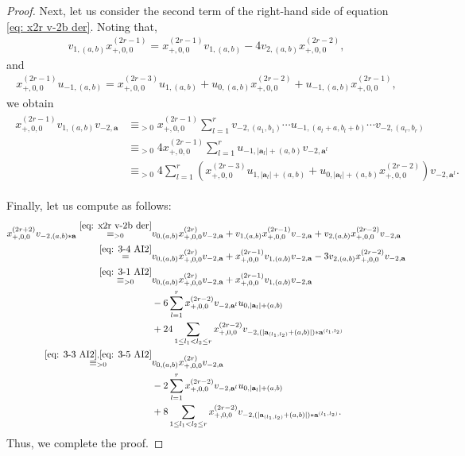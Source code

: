 \documentclass[12pt,a4paper]{amsart}
\theoremstyle{definition}
\numberwithin{equation}{subsection}
\begin{document}
\begin{proof}
  Next, let us consider the second term of the right-hand side of equation \eqref{eq: x2r v-2b der}.
  Noting that,
  \begin{align}\label{eq: 3-4 AI2}
    v_{1,(a,b)} x_{+,0,0}^{(2r-1)} = x_{+,0,0}^{(2r-1)} v_{1,(a,b)} -4v_{2,(a,b)} x_{+,0,0}^{(2r-2)},
  \end{align}
  and
  \begin{align*}
    x_{+,0,0}^{(2r-1)} u_{-1,(a,b)} = x_{+,0,0}^{(2r-3)} u_{1,(a,b)} + u_{0,(a,b)} x_{+,0,0}^{(2r-2)} + u_{-1,(a,b)}x_{+,0,0}^{(2r-1)},
  \end{align*}
  we obtain
  \begin{align}\label{eq: 3-5 AI2}
    \begin{split}
      x_{+,0,0}^{(2r-1)} v_{1,(a,b)} v_{-2,\mathbf{a}}
      &\equiv_{>0} x_{+,0,0}^{(2r-1)} \sum_{l=1}^r v_{-2,(a_1,b_1)} \cdots u_{-1,(a_l+a,b_l+b)} \cdots v_{-2,(a_r,b_r)}\\
      &\equiv_{>0} 4x_{+,0,0}^{(2r-1)} \sum_{l=1}^r u_{-1,|\mathbf{a}_l|+(a,b)} v_{-2,\mathbf{a}^l}\\
      &\equiv_{>0} 4\sum_{l=1}^r (x_{+,0,0}^{(2r-3)} u_{1,|\mathbf{a}_l|+(a,b)} + u_{0,|\mathbf{a}_l|+(a,b)} x_{+,0,0}^{(2r-2)}) v_{-2,\mathbf{a}^l}.
    \end{split}
  \end{align}
  
  Finally, let us compute as follows:
  \begin{align*}
    x_{+,0,0}^{(2r+2)} v_{-2,(a,b)*\mathbf{a}}
    \overset{\eqref{eq: x2r v-2b der}}{\equiv_{>0}}
    &v_{0,(a,b)} x_{+,0,0}^{(2r)} v_{-2,\mathbf{a}} + v_{1,(a,b)} x_{+,0,0}^{(2r-1)} v_{-2,\mathbf{a}} + v_{2,(a,b)} x_{+,0,0}^{(2r-2)} v_{-2,\mathbf{a}}\\
    \overset{\eqref{eq: 3-4 AI2}}{=}
    &v_{0,(a,b)} x_{+,0,0}^{(2r)} v_{-2,\mathbf{a}} + x_{+,0,0}^{(2r-1)} v_{1,(a,b)} v_{-2,\mathbf{a}} - 3v_{2,(a,b)} x_{+,0,0}^{(2r-2)} v_{-2,\mathbf{a}}\\
    \overset{\eqref{eq: 3-1 AI2}}{\equiv_{>0}}
    &v_{0,(a,b)} x_{+,0,0}^{(2r)} v_{-2,\mathbf{a}} + x_{+,0,0}^{(2r-1)} v_{1,(a,b)} v_{-2,\mathbf{a}}\\
    \phantom{\equiv_{>0}}
    &-6\sum_{l=1}^r x_{+,0,0}^{(2r-2)} v_{-2,\mathbf{a}^l} u_{0,|\mathbf{a}_l|+(a,b)}\\
    \phantom{\equiv_{>0}}
    &+ 24\sum_{1 \leq l_1 < l_2 \leq r} x_{+,0,0}^{(2r-2)} v_{-2,(|\mathbf{a}_{(l_1,l_2)}+(a,b)|)*\mathbf{a}^{(l_1,l_2)}}\\
    \overset{\eqref{eq: 3-3 AI2}, \eqref{eq: 3-5 AI2}}{\equiv_{>0}}
    &v_{0,(a,b)} x_{+,0,0}^{(2r)} v_{-2,\mathbf{a}}\\
    \phantom{\equiv_{>0}}
    &-2\sum_{l=1}^r x_{+,0,0}^{(2r-2)} v_{-2,\mathbf{a}^l} u_{0,|\mathbf{a}_l|+(a,b)}\\
    \phantom{\equiv_{>0}}
    &+ 8\sum_{1 \leq l_1 < l_2 \leq r} x_{+,0,0}^{(2r-2)} v_{-2,(|\mathbf{a}_{(l_1,l_2)}+(a,b)|)*\mathbf{a}^{(l_1,l_2)}}.
  \end{align*}
  Thus, we complete the proof.
\end{proof}
\end{document}
